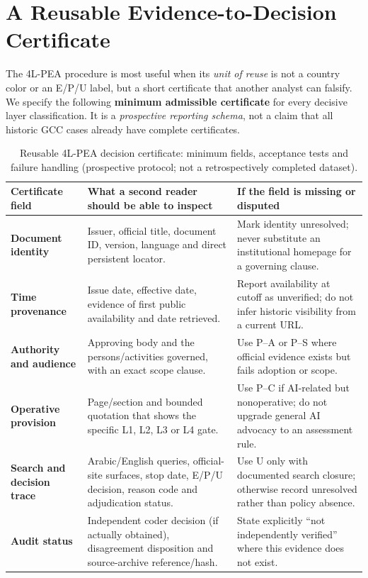 \documentclass[conference,letterpaper]{IEEEtran}
\begin{document}
\section{A Reusable Evidence-to-Decision Certificate}
\label{sec:certificate}
The 4L-PEA procedure is most useful when its \emph{unit of reuse} is not a country color or an E/P/U label, but a short certificate that another analyst can falsify. We specify the following \textbf{minimum admissible certificate} for every decisive layer classification. It is a \emph{prospective reporting schema}, not a claim that all historic GCC cases already have complete certificates.

\begin{table}[t]
\centering\caption{Reusable 4L-PEA decision certificate: minimum fields, acceptance tests and failure handling (prospective protocol; not a retrospectively completed dataset).}
\label{tab:certificate}\small
\setlength{\tabcolsep}{6pt}
\begin{tabularx}{\textwidth}{@{}p{}p{}X@{}}
\toprule
Certificate field & What a second reader should be able to inspect & If the field is missing or disputed\\\midrule
\textbf{Document identity} & Issuer, official title, document ID, version, language and direct persistent locator. & Mark identity unresolved; never substitute an institutional homepage for a governing clause.\\
\textbf{Time provenance} & Issue date, effective date, evidence of first public availability and date retrieved. & Report availability at cutoff as unverified; do not infer historic visibility from a current URL.\\
\textbf{Authority and audience} & Approving body and the persons/activities governed, with an exact scope clause. & Use P--A or P--S where official evidence exists but fails adoption or scope.\\
\textbf{Operative provision} & Page/section and bounded quotation that shows the specific L1, L2, L3 or L4 gate. & Use P--C if AI-related but nonoperative; do not upgrade general AI advocacy to an assessment rule.\\
\textbf{Search and decision trace} & Arabic/English queries, official-site surfaces, stop date, E/P/U decision, reason code and adjudication status. & Use U only with documented search closure; otherwise record unresolved rather than policy absence.\\
\textbf{Audit status} & Independent coder decision (if actually obtained), disagreement disposition and source-archive reference/hash. & State explicitly ``not independently verified'' where this evidence does not exist.\\
\bottomrule
\end{tabularx}
\end{table}
\end{document}
